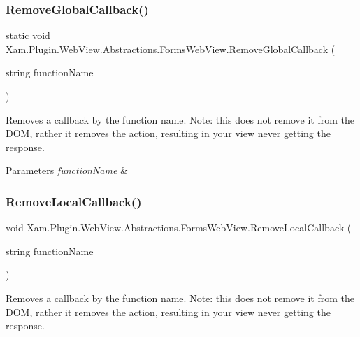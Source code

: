 \subsubsection{\texorpdfstring{Remove\+Global\+Callback()}{RemoveGlobalCallback()}}
{\footnotesize\ttfamily static void Xam.\+Plugin.\+Web\+View.\+Abstractions.\+Forms\+Web\+View.\+Remove\+Global\+Callback (\begin{DoxyParamCaption}\item[{string}]{function\+Name }\end{DoxyParamCaption})\hspace{0.3cm}{\ttfamily [static]}}



Removes a callback by the function name. Note\+: this does not remove it from the D\+OM, rather it removes the action, resulting in your view never getting the response. 


\begin{DoxyParams}{Parameters}
{\em function\+Name} & \\
\hline
\end{DoxyParams}
\mbox{\label{class_xam_1_1_plugin_1_1_web_view_1_1_abstractions_1_1_forms_web_view_a1335848a5cd8da3b36dd8e49fe31094d}} 
\subsubsection{\texorpdfstring{Remove\+Local\+Callback()}{RemoveLocalCallback()}}
{\footnotesize\ttfamily void Xam.\+Plugin.\+Web\+View.\+Abstractions.\+Forms\+Web\+View.\+Remove\+Local\+Callback (\begin{DoxyParamCaption}\item[{string}]{function\+Name }\end{DoxyParamCaption})}



Removes a callback by the function name. Note\+: this does not remove it from the D\+OM, rather it removes the action, resulting in your view never getting the response. 


